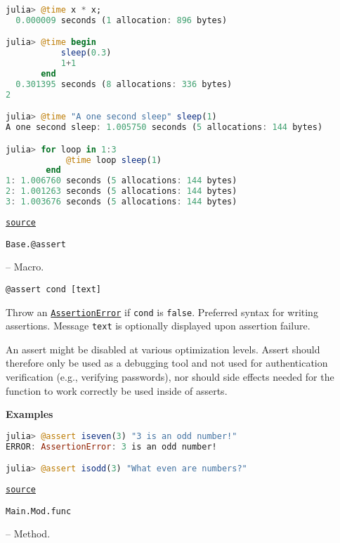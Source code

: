 \begin{adjustwidth}{2em}{0pt}
\begin{lstlisting}[language=julia, style=jlcodestyle]
julia> @time x * x;
  0.000009 seconds (1 allocation: 896 bytes)

julia> @time begin
           sleep(0.3)
           1+1
       end
  0.301395 seconds (8 allocations: 336 bytes)
2

julia> @time "A one second sleep" sleep(1)
A one second sleep: 1.005750 seconds (5 allocations: 144 bytes)

julia> for loop in 1:3
            @time loop sleep(1)
        end
1: 1.006760 seconds (5 allocations: 144 bytes)
2: 1.001263 seconds (5 allocations: 144 bytes)
3: 1.003676 seconds (5 allocations: 144 bytes)
\end{lstlisting}



\href{https://github.com/JuliaLang/julia/blob/8e630552924eac54c809aa7bc30871c7df1582d3/base/timing.jl#L206-L260}{\texttt{source}}


\end{adjustwidth}
\hypertarget{4796942656392369899}{\texttt{Base.@assert}}  -- {Macro.}

\begin{adjustwidth}{2em}{0pt}


\begin{lstlisting}[]
@assert cond [text]
\end{lstlisting}

Throw an \href{@ref}{\texttt{AssertionError}} if \texttt{cond} is \texttt{false}. Preferred syntax for writing assertions. Message \texttt{text} is optionally displayed upon assertion failure.

\begin{tcolorbox}[toptitle=-1mm,bottomtitle=1mm,colback=admonition-warning!50!white,colframe=admonition-warning,title=\textbf{Warning}]
An assert might be disabled at various optimization levels. Assert should therefore only be used as a debugging tool and not used for authentication verification (e.g., verifying passwords), nor should side effects needed for the function to work correctly be used inside of asserts.

\end{tcolorbox}
\textbf{Examples}


\begin{lstlisting}[language=julia, style=jlcodestyle]
julia> @assert iseven(3) "3 is an odd number!"
ERROR: AssertionError: 3 is an odd number!

julia> @assert isodd(3) "What even are numbers?"
\end{lstlisting}



\href{https://github.com/JuliaLang/julia/blob/8e630552924eac54c809aa7bc30871c7df1582d3/base/error.jl#L197-L217}{\texttt{source}}


\end{adjustwidth}
\hypertarget{6220747639501087335}{\texttt{Main.Mod.func}}  -- {Method.}

